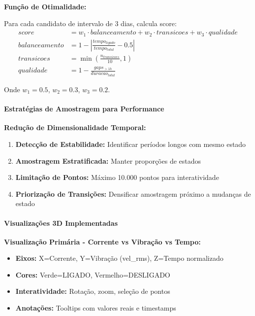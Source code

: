 \textbf{Função de Otimalidade:}

Para cada candidato de intervalo de 3 dias, calcula score:
\begin{align}
score &= w_1 \cdot balanceamento + w_2 \cdot transicoes + w_3 \cdot qualidade \\
balanceamento &= 1 - \left| \frac{tempo_{ligado}}{tempo_{total}} - 0.5 \right| \\
transicoes &= \min\left( \frac{n_{transicoes}}{10}, 1 \right) \\
qualidade &= 1 - \frac{gaps_{>1h}}{duracao_{total}}
\end{align}

Onde $w_1 = 0.5$, $w_2 = 0.3$, $w_3 = 0.2$.

\paragraph{Estratégias de Amostragem para Performance}

\textbf{Redução de Dimensionalidade Temporal:}

\begin{enumerate}
    \item \textbf{Detecção de Estabilidade:} Identificar períodos longos com mesmo estado
    \item \textbf{Amostragem Estratificada:} Manter proporções de estados
    \item \textbf{Limitação de Pontos:} Máximo 10.000 pontos para interatividade
    \item \textbf{Priorização de Transições:} Densificar amostragem próximo a mudanças de estado
\end{enumerate}

\paragraph{Visualizações 3D Implementadas}

\textbf{Visualização Primária - Corrente vs Vibração vs Tempo:}

\begin{itemize}
    \item \textbf{Eixos:} X=Corrente, Y=Vibração (vel\_rms), Z=Tempo normalizado
    \item \textbf{Cores:} Verde=LIGADO, Vermelho=DESLIGADO
    \item \textbf{Interatividade:} Rotação, zoom, seleção de pontos
    \item \textbf{Anotações:} Tooltips com valores reais e timestamps
\end{itemize}

